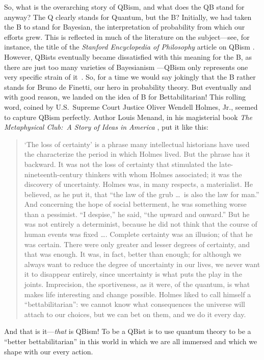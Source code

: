 \documentclass[aps,pra,superscriptaddress,12pt,tightenlines,nofootinbib]{revtex4-2}
\begin{document}
So, what is the overarching story of QBism, and what does the QB stand for anyway? The Q clearly stands for Quantum, but the B\@? Initially, we had taken the B to stand for Bayesian, the interpretation of probability from which our efforts grew.  This is reflected in much of the literature on the subject---see, for instance, the title of the {\sl Stanford Encyclopedia of Philosophy\/} article on QBism \cite{sep-quantum-bayesian}. However, QBists eventually became dissatisfied with this meaning for the B, as there are just too many varieties of Bayesianism \cite{Good83}---QBism only represents one very specific strain of it~\cite{stacey-vonneumann}.  So, for a time we would say jokingly that the B rather stands for Bruno de Finetti, our hero in probability theory.  But eventually and with good reason, we landed on the idea of B for Bettabilitarian! This rolling word, coined by U.S.\ Supreme Court Justice Oliver Wendell Holmes, Jr., seemed to capture QBism perfectly.  Author Louis Menand, in his magisterial book {\sl The Metaphysical Club:\ A Story of Ideas in America} \cite{Menand01}, put it like this:
\begin{quote}
`The loss of certainty' is a phrase many intellectual historians have used the characterize the period in which Holmes lived. But the phrase has it backward. It was not the loss of certainty that stimulated the late-nineteenth-century thinkers with whom Holmes associated; it was the discovery of uncertainty. Holmes was, in many respects, a materialist. He believed, as he put it, that ``the law of the grub \ldots\ is also the law for man.''  And concerning the hope of social betterment, he was something worse than a pessimist. ``I despise,'' he said, ``the upward and onward.'' But he was not entirely a determinist, because he did not think that the course of human events was fixed \ldots. Complete certainty was an illusion; of that he was certain. There were only greater and lesser degrees of certainty, and that was enough.  It was, in fact, better than enough; for although we always want to reduce the degree of uncertainty in our lives, we never want it to disappear entirely, since uncertainty is what puts the play in the joints.  Imprecision, the sportiveness, as it were, of the quantum, is what makes life interesting and change possible. Holmes liked to call himself a ``bettabilitarian'':  we cannot know what consequences the universe will attach to our choices, but we can bet on them, and we do it every day.
\end{quote}
And that is it---{\it that\/} is QBism!  To be a QBist is to use quantum theory to be a ``better bettabilitarian'' in this world in which we are all immersed and which we shape with our every action.
\end{document}
